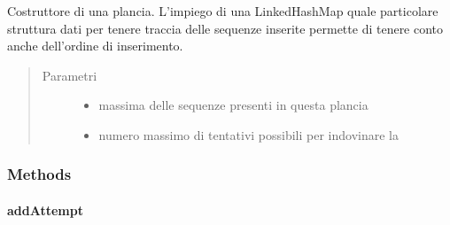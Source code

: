 \documentclass[letterpaper,10pt,italian,openany,oneside]{sphinxmanual}
\begin{document}
\begin{fulllineitems}
\label{\detokenize{test/it/unicam/cs/pa/mastermind/gamecore/BoardModel:it.unicam.cs.pa.mastermind.gamecore.BoardModel.BoardModel(int, int)}}
Costruttore di una plancia. L’impiego di una LinkedHashMap quale particolare struttura dati per tenere traccia delle sequenze inserite permette di tenere conto anche dell’ordine di inserimento.
\begin{quote}\begin{description}
\item[{Parametri}] \leavevmode\begin{itemize}
\item {} 
 \textendash{} massima delle sequenze presenti in questa plancia

\item {} 
 \textendash{} numero massimo di tentativi possibili per indovinare la 

\end{itemize}

\end{description}\end{quote}

\end{fulllineitems}



\subsubsection{Methods}
\label{\detokenize{test/it/unicam/cs/pa/mastermind/gamecore/BoardModel:methods}}

\paragraph{addAttempt}
\label{\detokenize{test/it/unicam/cs/pa/mastermind/gamecore/BoardModel:addattempt}}
\end{document}
